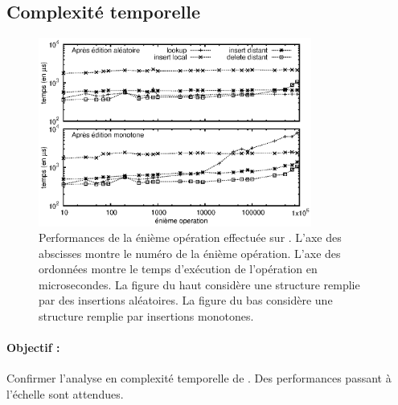 \subsection{Complexité temporelle}

\begin{figure}
  \begin{center}
    \includegraphics[width=0.8\textwidth]{img/lseq/time.eps}
    \caption[Performances de \LSEQ] {\label{repl:img:time} Performances de la
      énième opération effectuée sur \LSEQ. L'axe des abscisses montre le numéro
      de la énième opération. L'axe des ordonnées montre le temps d'exécution de
      l'opération en microsecondes. La figure du haut considère une structure
      remplie par des insertions aléatoires. La figure du bas considère une
      structure remplie par insertions monotones.}
  \end{center}
\end{figure}

\paragraph{Objectif :} Confirmer l'analyse en complexité temporelle de
\LSEQ. Des performances passant à l'échelle sont attendues.

